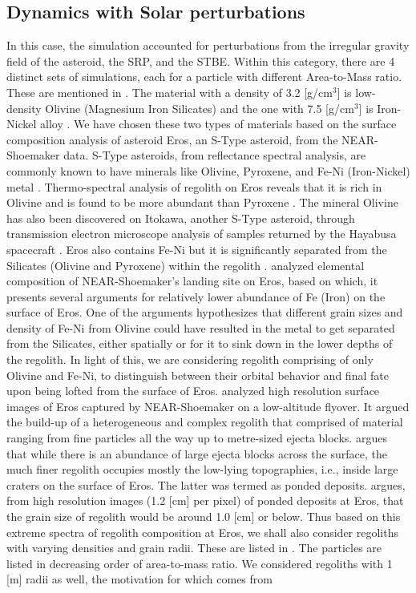 \subsection{Dynamics with Solar perturbations}
\label{regolith_longest_edge_with_solar}
In this case, the simulation accounted for perturbations from the irregular gravity field of the asteroid, the \gls{SRP}, and the \gls{STBE}. Within this category, there are 4 distinct sets of simulations, each for a particle with different Area-to-Mass ratio. These are mentioned in . The material with a density of 3.2 [g/cm$^3$] is low-density Olivine (Magnesium Iron Silicates) and the one with 7.5 [g/cm$^3$] is Iron-Nickel alloy \parencite{passiveSorting}. We have chosen these two types of materials based on the surface composition analysis of asteroid Eros, an S-Type asteroid, from the \gls{NEAR}-Shoemaker data. S-Type asteroids, from reflectance spectral analysis, are commonly known to have minerals like Olivine, Pyroxene, and Fe-Ni (Iron-Nickel) metal \parencite{Nittler2001}. Thermo-spectral analysis of regolith on Eros reveals that it is rich in Olivine and is found to be more abundant than Pyroxene \parencite{McCoy2001}. The mineral Olivine has also been discovered on Itokawa, another S-Type asteroid, through transmission electron microscope analysis of samples returned by the Hayabusa spacecraft \parencite{olivineHayabusa}. Eros also contains Fe-Ni but it is significantly separated from the Silicates (Olivine and Pyroxene) within the regolith \parencite{Nittler2001}. \cite{Evans2001} analyzed elemental composition of \gls{NEAR}-Shoemaker's landing site on Eros, based on which, it presents several arguments for relatively lower abundance of Fe (Iron) on the surface of Eros. One of the arguments hypothesizes that different grain sizes and density of Fe-Ni from Olivine could have resulted in the metal to get separated from the Silicates, either spatially or for it to sink down in the lower depths of the regolith. In light of this, we are considering regolith comprising of only Olivine and Fe-Ni, to distinguish between their orbital behavior and final fate upon being lofted from the surface of Eros. \cite{Veverka2001} analyzed high resolution surface images of Eros captured by \gls{NEAR}-Shoemaker on a low-altitude flyover. It argued the build-up of a heterogeneous and complex regolith that comprised of material ranging from fine particles all the way up to metre-sized ejecta blocks. \cite{Veverka2001} argues that while there is an abundance of large ejecta blocks across the surface, the much finer regolith occupies mostly the low-lying topographies, i.e., inside large craters on the surface of Eros. The latter was termed as ponded deposits. \cite{Robinson2001} argues, from high resolution images (1.2 [cm] per pixel) of ponded deposits at Eros, that the grain size of regolith would be around 1.0 [cm] or below. Thus based on this extreme spectra of regolith composition at Eros, we shall also consider regoliths with varying densities and grain radii. These are listed in . The particles are listed in decreasing order of area-to-mass ratio. We considered regoliths with 1 [m] radii as well, the motivation for which comes from 